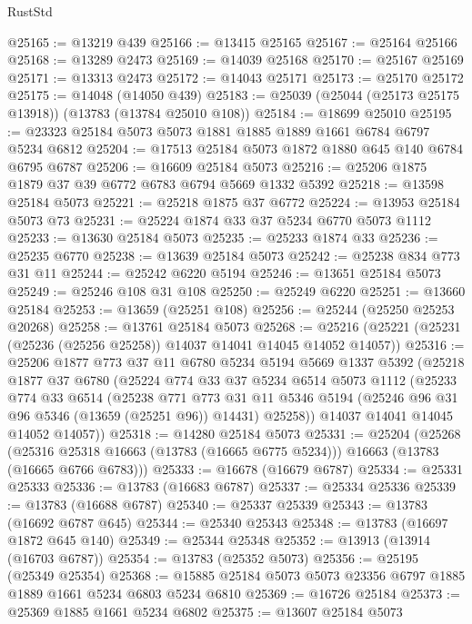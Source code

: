 \begin{lexlean}{RustStd}
\begin{coremodule}
@25165 := @13219 @439
@25166 := @13415 @25165
@25167 := @25164 @25166
@25168 := @13289 @2473
@25169 := @14039 @25168
@25170 := @25167 @25169
@25171 := @13313 @2473
@25172 := @14043 @25171
@25173 := @25170 @25172
@25175 := @14048 (@14050 @439)
@25183 := @25039 (@25044 (@25173 @25175 @13918)) (@13783 (@13784 @25010 @108))
@25184 := @18699 @25010
@25195 := @23323 @25184 @5073 @5073 @1881 @1885 @1889 @1661 @6784 @6797 @5234 @6812
@25204 := @17513 @25184 @5073 @1872 @1880 @645 @140 @6784 @6795 @6787
@25206 := @16609 @25184 @5073
@25216 := @25206 @1875 @1879 @37 @39 @6772 @6783 @6794 @5669 @1332 @5392
@25218 := @13598 @25184 @5073
@25221 := @25218 @1875 @37 @6772
@25224 := @13953 @25184 @5073 @73
@25231 := @25224 @1874 @33 @37 @5234 @6770 @5073 @1112
@25233 := @13630 @25184 @5073
@25235 := @25233 @1874 @33
@25236 := @25235 @6770
@25238 := @13639 @25184 @5073
@25242 := @25238 @834 @773 @31 @11
@25244 := @25242 @6220 @5194
@25246 := @13651 @25184 @5073
@25249 := @25246 @108 @31 @108
@25250 := @25249 @6220
@25251 := @13660 @25184
@25253 := @13659 (@25251 @108)
@25256 := @25244 (@25250 @25253 @20268)
@25258 := @13761 @25184 @5073
@25268 := @25216 (@25221 (@25231 (@25236 (@25256 @25258)) @14037 @14041 @14045 @14052 @14057))
@25316 := @25206
    @1877
    @773
    @37
    @11
    @6780
    @5234
    @5194
    @5669
    @1337
    @5392
    (@25218
      @1877
      @37
      @6780
      (@25224
        @774
        @33
        @37
        @5234
        @6514
        @5073
        @1112
        (@25233
          @774
          @33
          @6514
          (@25238
            @771
            @773
            @31
            @11
            @5346
            @5194
            (@25246 @96 @31 @96 @5346 (@13659 (@25251 @96)) @14431)
            @25258))
        @14037
        @14041
        @14045
        @14052
        @14057))
@25318 := @14280 @25184 @5073
@25331 := @25204
    (@25268
      (@25316 @25318 @16663 (@13783 (@16665 @6775 @5234)))
      @16663
      (@13783 (@16665 @6766 @6783)))
@25333 := @16678 (@16679 @6787)
@25334 := @25331 @25333
@25336 := @13783 (@16683 @6787)
@25337 := @25334 @25336
@25339 := @13783 (@16688 @6787)
@25340 := @25337 @25339
@25343 := @13783 (@16692 @6787 @645)
@25344 := @25340 @25343
@25348 := @13783 (@16697 @1872 @645 @140)
@25349 := @25344 @25348
@25352 := @13913 (@13914 (@16703 @6787))
@25354 := @13783 (@25352 @5073)
@25356 := @25195 (@25349 @25354)
@25368 := @15885 @25184 @5073 @5073 @23356 @6797 @1885 @1889 @1661 @5234 @6803 @5234 @6810
@25369 := @16726 @25184
@25373 := @25369 @1885 @1661 @5234 @6802
@25375 := @13607 @25184 @5073

\end{coremodule}
\end{lexlean}
